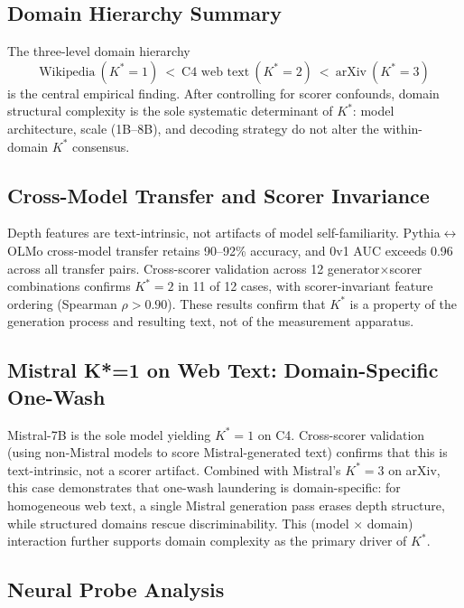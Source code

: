 \documentclass[11pt,a4paper]{article}
\begin{document}
\subsection{Domain Hierarchy Summary}

The three-level domain hierarchy
\begin{equation}
    \text{Wikipedia}\ (K^*{=}1)\ <\ \text{C4 web text}\ (K^*{=}2)\ <\ \text{arXiv}\ (K^*{=}3)
\end{equation}
is the central empirical finding. After controlling for scorer confounds, domain structural complexity is the sole systematic determinant of $K^*$: model architecture, scale (1B--8B), and decoding strategy do not alter the within-domain $K^*$ consensus.

\subsection{Cross-Model Transfer and Scorer Invariance}

Depth features are text-intrinsic, not artifacts of model self-familiarity. Pythia$\leftrightarrow$OLMo cross-model transfer retains 90--92\% accuracy, and 0v1 AUC exceeds 0.96 across all transfer pairs. Cross-scorer validation across 12 generator$\times$scorer combinations confirms $K^*{=}2$ in 11 of 12 cases, with scorer-invariant feature ordering (Spearman $\rho > 0.90$). These results confirm that $K^*$ is a property of the generation process and resulting text, not of the measurement apparatus.

\subsection{Mistral K*=1 on Web Text: Domain-Specific One-Wash}
\label{sec:mistral}

Mistral-7B is the sole model yielding $K^*{=}1$ on C4. Cross-scorer validation (using non-Mistral models to score Mistral-generated text) confirms that this is text-intrinsic, not a scorer artifact. Combined with Mistral's $K^*{=}3$ on arXiv, this case demonstrates that one-wash laundering is domain-specific: for homogeneous web text, a single Mistral generation pass erases depth structure, while structured domains rescue discriminability. This (model $\times$ domain) interaction further supports domain complexity as the primary driver of $K^*$.

\subsection{Neural Probe Analysis}
\end{document}
